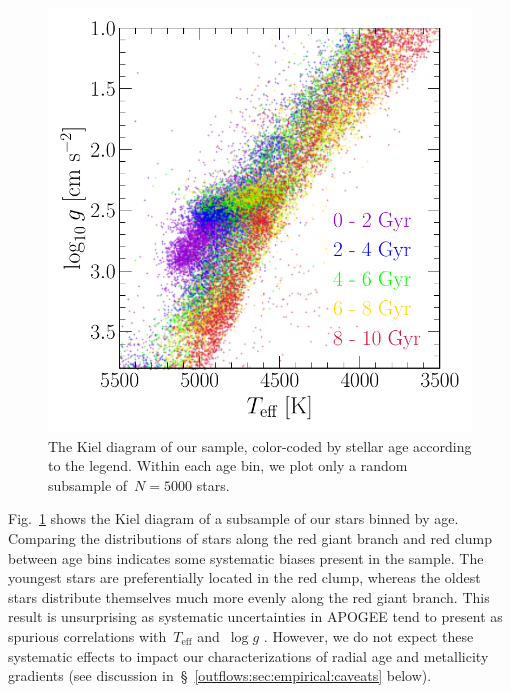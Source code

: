 \begin{figure}
\centering
\includegraphics[scale = 0.6]{kiel_diagram.pdf}
\caption{
The Kiel diagram of our sample, color-coded by stellar age according to the
legend.
Within each age bin, we plot only a random subsample of~$N = 5000$ stars.
}
\label{outflows:fig:kiel-diagram}
\end{figure}

Fig.~\ref{outflows:fig:kiel-diagram} shows the Kiel diagram of a subsample of
our stars binned by age.
Comparing the distributions of stars along the red giant branch and red clump
between age bins indicates some systematic biases present in the sample.
The youngest stars are preferentially located in the red clump, whereas the
oldest stars distribute themselves much more evenly along the red giant branch.
This result is unsurprising as systematic uncertainties in APOGEE tend to
present as spurious correlations with~$T_\text{eff}$ and~$\log g$
\citep[e.g.,][]{Joensson2018, Eilers2022}.
However, we do not expect these systematic effects to impact our
characterizations of radial age and metallicity gradients (see discussion
in~\S~\ref{outflows:sec:empirical:caveats} below).






